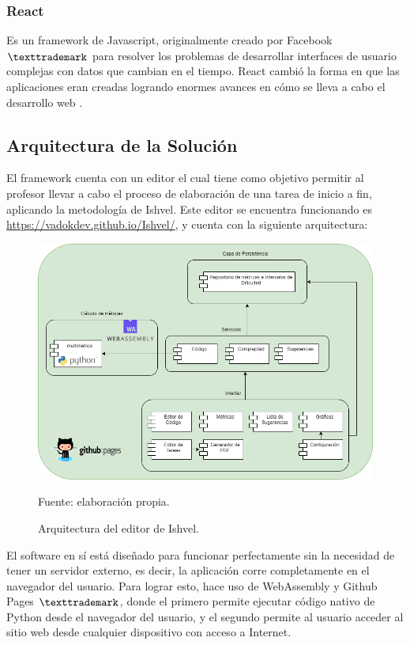 \documentclass[letterpaper,12pt]{article}
\begin{document}
\subsubsection{React}

Es un framework de Javascript, originalmente creado por Facebook$\texttrademark$ para resolver los problemas de desarrollar interfaces de usuario complejas con datos que cambian en el tiempo. React cambió la forma en que las aplicaciones eran creadas logrando enormes avances en cómo se lleva a cabo el desarrollo web \cite{Gackenheimer2015}.

\subsection{Arquitectura de la Solución}

El framework cuenta con un editor el cual tiene como objetivo permitir al profesor llevar a cabo el proceso de elaboración de una tarea de inicio a fin, aplicando la metodología de Ishvel. Este editor se encuentra funcionando es \url{https://vadokdev.github.io/Ishvel/}, y cuenta con la siguiente arquitectura:
\begin{figure}[H]
  \centering
  \includegraphics[width=1\textwidth]{figures/architecture.png}
  \caption{Arquitectura del editor de Ishvel.} Fuente: elaboración propia.
  \label{img:architecture}
\end{figure}
El software en sí está diseñado para funcionar perfectamente sin la necesidad de tener un servidor externo, es decir, la aplicación corre completamente en el navegador del usuario. Para lograr esto, hace uso de WebAssembly y Github Pages $\texttrademark$, donde el primero permite ejecutar código nativo de Python desde el navegador del usuario, y el segundo permite al usuario acceder al sitio web desde cualquier dispositivo con acceso a Internet.
\end{document}
